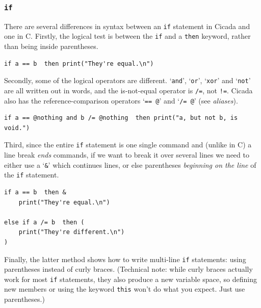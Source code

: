 \documentclass{article}
\newenvironment{code}{
       \begin{list}{}{
               \setlength{\leftmargin}{.4in}
               \setlength{\rightmargin}{0in}
               \setlength{\topsep}{.2in}
       }
       \small
       \item[] }
       { \end{list}   }
\begin{document}
\subsubsection{\texttt{if}} 

There are several differences in syntax between an \texttt{if} statement in Cicada and one in C.  Firstly, the logical test is between the \verb#if# and a \verb#then# keyword, rather than being inside parentheses.

\begin{code} \begin{verbatim}
if a == b  then print("They're equal.\n")
\end{verbatim} \end{code}

\noindent Secondly, some of the logical operators are different.  `\verb#and#', `\verb#or#', `\verb#xor#' and `\verb#not#' are all written out in words, and the is-not-equal operator is \verb#/=#, not \verb#!=#.  Cicada also has the reference-comparison operators `\verb#== @#' and `\verb#/= @#' (see \emph{aliases}).

\begin{code} \begin{verbatim}
if a == @nothing and b /= @nothing  then print("a, but not b, is void.")
\end{verbatim} \end{code}

\noindent Third, since the entire \verb#if# statement is one single command and (unlike in C) a line break \emph{ends} commands, if we want to break it over several lines we need to either use a `\verb#&#' which continues lines, or else parentheses \emph{beginning on the line} of the \verb#if# statement.

\begin{code} \begin{verbatim}
if a == b  then &
    print("They're equal.\n")

else if a /= b  then (
    print("They're different.\n")
)
\end{verbatim} \end{code}

\noindent Finally, the latter method shows how to write multi-line \verb#if# statements:  using parentheses instead of curly braces.  (Technical note:  while curly braces actually work for most \verb#if# statements, they also produce a new variable space, so defining new members or using the keyword \verb#this# won't do what you expect.  Just use parentheses.)
\end{document}
